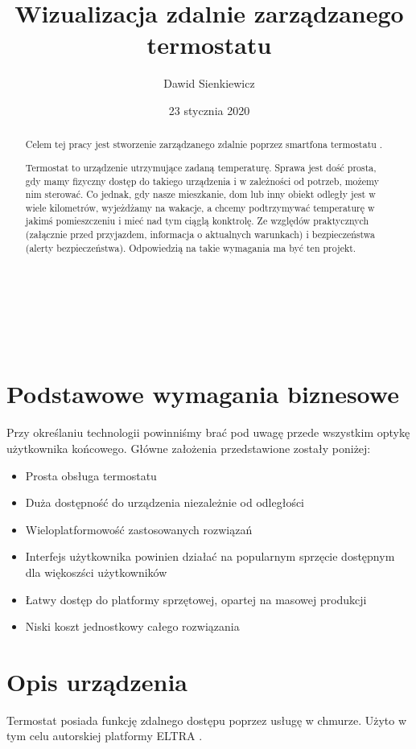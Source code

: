 \documentclass[a4paper,10pt]{article}
\date{23 stycznia 2020}
\title{Wizualizacja zdalnie zarządzanego termostatu}
\author{Dawid Sienkiewicz \album{35918} }
\begin{document}
\maketitle\mbox{}\\\\\\
\begin{abstract}
Celem tej pracy jest stworzenie zarządzanego zdalnie poprzez smartfona termostatu \cite{ThermostatWiki}.

Termostat to urządzenie utrzymujące zadaną temperaturę. Sprawa jest dość prosta, gdy mamy fizyczny dostęp do takiego urządzenia i w zależności od potrzeb, możemy nim sterować. Co jednak, gdy nasze mieszkanie, dom lub inny obiekt odległy jest w wiele kilometrów, wyjeżdżamy na wakacje, a chcemy podtrzymywać temperaturę w jakimś pomieszczeniu i mieć nad tym ciąglą konktrolę. Ze względów praktycznych (załącznie przed przyjazdem, informacja o aktualnych warunkach) i bezpieczeństwa (alerty bezpieczeństwa). Odpowiedzią na takie wymagania ma być ten projekt.

\end{abstract}
\newpage
\tableofcontents
\newpage
\section{Podstawowe wymagania biznesowe}
\label{zalozenia_projektu}

Przy określaniu technologii powinniśmy brać pod uwagę przede wszystkim optykę użytkownika końcowego. Główne założenia przedstawione zostały poniżej:\\ 

\begin{itemize}
    \item Prosta obsługa termostatu
	\item Duża dostępność do urządzenia niezależnie od odległości
    \item Wieloplatformowość zastosowanych rozwiązań
	\item Interfejs użytkownika powinien działać na popularnym sprzęcie dostępnym dla więkoszści użytkowników
	\item Łatwy dostęp do platformy sprzętowej, opartej na masowej produkcji
	\item Niski koszt jednostkowy całego rozwiązania
\end{itemize}

\section{Opis urządzenia}
\label{opis_systemu}
Termostat posiada funkcję zdalnego dostępu poprzez usługę w chmurze. Użyto w tym celu autorskiej platformy ELTRA \cite{EltraWebsite}. \\
\end{document}
